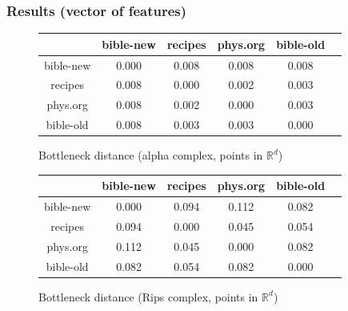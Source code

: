 \documentclass[unknownkeysallowed]{beamer}
\def\R{\mathbb R}
\begin{document}
\begin{frame}
\frametitle{Results (vector of features)}
\bigskip
\begin{figure}
\begin{tabular}{ c c c c c c }
	& bible-new & recipes & phys.org & bible-old \\
  	\hline			
   bible-new & 0.000 & 0.008 & 0.008 & 0.008 \\
   recipes   & 0.008 & 0.000 & 0.002 & 0.003 \\
   phys.org  & 0.008 & 0.002 & 0.000 & 0.003 \\
   bible-old & 0.008 & 0.003 & 0.003 & 0.000 
\end{tabular}
\caption{Bottleneck distance (alpha complex, points in $\R ^d$)}
\end{figure}

\begin{figure}
\begin{tabular}{ c c c c c c }
	& bible-new & recipes & phys.org & bible-old \\
  	\hline			
  bible-new & 0.000 & 0.094 & 0.112  &  0.082 \\
  recipes   & 0.094 & 0.000 & 0.045  &  0.054 \\
  phys.org  & 0.112 & 0.045 & 0.000  &  0.082 \\
  bible-old & 0.082 & 0.054 & 0.082  &  0.000 
\end{tabular}
\caption{Bottleneck distance (Rips complex, points in $\R ^d$)}
\end{figure}
\medskip
\end{frame}
\end{document}
